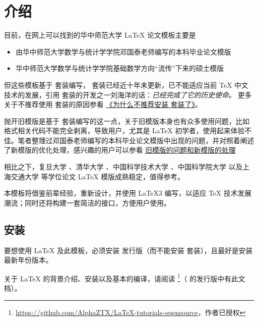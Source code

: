 
\section{介绍} 

目前，在网上可以找到的华中师范大学 \LaTeX{} 论文模板主要是

\begin{itemize}
  \item 由华中师范大学数学与统计学学院邓国泰老师编写的本科毕业论文模版
  \item 华中师范大学数学与统计学学院基础数学方向“流传”下来的硕士模版
\end{itemize}

但这些模板基于 \CTeX 套装编写， \CTeX 套装已经近十年未更新，已不能适应当前 \TeX{} 中文技术的发展，引用 \CTeX 套装的开发之一刘海洋的话：\emph{\CTeX 已经完成了它的历史使命。} 更多关于不推荐使用 \CTeX 套装的原因参看 \href{https://gitee.com/xkwxdyy/CCNUthesis/wikis/%E5%B8%B8%E8%A7%81%E9%97%AE%E9%A2%98FAQ/%E4%B8%BA%E4%BB%80%E4%B9%88%E4%B8%8D%E6%8E%A8%E8%8D%90%E5%AE%89%E8%A3%85\CTeX%E5%A5%97%E8%A3%85%E4%BA%86}{《为什么不推荐安装 \CTeX 套装了》}。

抛开旧模版是基于 \CTeX 套装编写的这一点，关于旧模版本身也有众多使用问题，比如格式相关代码不能完全剥离，导致用户，尤其是 \LaTeX{} 初学者，使用起来体验不佳。笔者整理过邓国泰老师编写的本科毕业论文模版中出现的问题，并对照着阐述了新模版的优化处理，感兴趣的用户可以参看 \href{https://gitee.com/xkwxdyy/CCNUthesis/wikis/%E6%97%A7%E6%A8%A1%E7%89%88%E7%9A%84%E9%97%AE%E9%A2%98%E5%92%8C%E6%96%B0%E6%A8%A1%E7%89%88%E7%9A%84%E5%A4%84%E7%90%86}{旧模版的问题和新模版的处理}

相比之下，复旦大学 、清华大学 、中国科学技术大学 、中国科学院大学  以及上海交通大学  等学位论文 \LaTeX{} 模版成熟稳定，值得参考。

本模板将借鉴前辈经验，重新设计，并使用 \LaTeX3 编写，以适应 \TeX{} 技术发展潮流；同时还将构建一套简洁的接口，方便用户使用。


\subsection{\TeXLive 安装}

要想使用 \LaTeX{} 及此模板，必须安装 \TeXLive 发行版（而不能安装 \CTeX 套装），且最好是安装最新年份版本。

关于 \LaTeX{} 的背景介绍、安装以及基本的编译，请阅读  \footnote{\url{https://github.com/AlphaZTX/LaTeX-tutorials-opensource}，作者已授权}（ 的发行版中有此文档）。

